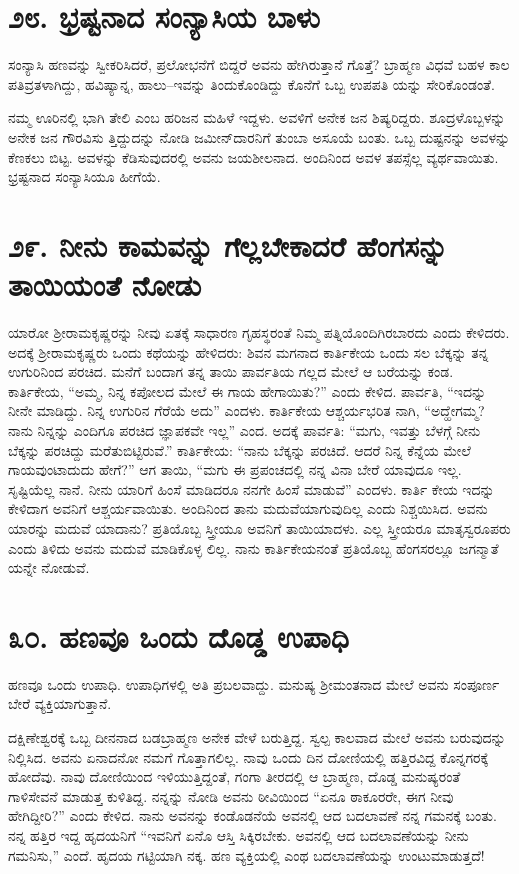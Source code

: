 \section{\num{೨೮. } ಭ್ರಷ್ಟನಾದ ಸಂನ್ಯಾಸಿಯ ಬಾಳು}

ಸಂನ್ಯಾಸಿ ಹಣವನ್ನು ಸ್ವೀಕರಿಸಿದರೆ, ಪ್ರಲೋಭನೆಗೆ ಬಿದ್ದರೆ ಅವನು ಹೇಗಿರುತ್ತಾನೆ ಗೊತ್ತೆ? ಬ್ರಾಹ್ಮಣ ವಿಧವೆ ಬಹಳ ಕಾಲ ಪತಿವ್ರತಳಾಗಿದ್ದು, ಹವಿಷ್ಯಾನ್ನ, ಹಾಲು–ಇವನ್ನು ತಿಂದುಕೊಂಡಿದ್ದು ಕೊನೆಗೆ ಒಬ್ಬ ಉಪಪತಿ ಯನ್ನು ಸೇರಿಕೊಂಡಂತೆ.

ನಮ್ಮ ಊರಿನಲ್ಲಿ ಭಾಗಿ ತೇಲಿ ಎಂಬ ಹರಿಜನ ಮಹಿಳೆ ಇದ್ದಳು. ಅವಳಿಗೆ ಅನೇಕ ಜನ ಶಿಷ್ಯರಿದ್ದರು. ಶೂದ್ರಳೊಬ್ಬಳನ್ನು ಅನೇಕ ಜನ ಗೌರವಿಸು ತ್ತಿದ್ದುದನ್ನು ನೋಡಿ ಜಮೀನ್​ದಾರನಿಗೆ ತುಂಬಾ ಅಸೂಯೆ ಬಂತು. ಒಬ್ಬ ದುಷ್ಟನನ್ನು ಅವಳನ್ನು ಕೆಣಕಲು ಬಿಟ್ಟ. ಅವಳನ್ನು ಕೆಡಿಸುವುದರಲ್ಲಿ ಅವನು ಜಯಶೀಲನಾದ. ಅಂದಿನಿಂದ ಅವಳ ತಪಸ್ಸೆಲ್ಲ ವ್ಯರ್ಥವಾಯಿತು. ಭ್ರಷ್ಟನಾದ ಸಂನ್ಯಾಸಿಯೂ ಹೀಗೆಯೆ.


\section{\num{೨೯. } ನೀನು ಕಾಮವನ್ನು ಗೆಲ್ಲಬೇಕಾದರೆ ಹೆಂಗಸನ್ನು ತಾಯಿಯಂತೆ ನೋಡು}

ಯಾರೋ ಶ್ರೀರಾಮಕೃಷ್ಣರನ್ನು ನೀವು ಏತಕ್ಕೆ ಸಾಧಾರಣ ಗೃಹಸ್ಥರಂತೆ ನಿಮ್ಮ ಪತ್ನಿಯೊಂದಿಗಿರಬಾರದು ಎಂದು ಕೇಳಿದರು. ಅದಕ್ಕೆ ಶ್ರೀರಾಮಕೃಷ್ಣರು ಒಂದು ಕಥೆಯನ್ನು ಹೇಳಿದರು: ಶಿವನ ಮಗನಾದ ಕಾರ್ತಿಕೇಯ ಒಂದು ಸಲ ಬೆಕ್ಕನ್ನು ತನ್ನ ಉಗುರಿನಿಂದ ಪರಚಿದ. ಮನೆಗೆ ಬಂದಾಗ ತನ್ನ ತಾಯಿ ಪಾರ್ವತಿಯ ಗಲ್ಲದ ಮೇಲೆ ಆ ಬರೆಯನ್ನು ಕಂಡ. ಕಾರ್ತಿಕೇಯ, “ಅಮ್ಮ, ನಿನ್ನ ಕಪೋಲದ ಮೇಲೆ ಈ ಗಾಯ ಹೇಗಾಯಿತು?” ಎಂದು ಕೇಳಿದ. ಪಾರ್ವತಿ, “ಇದನ್ನು ನೀನೇ ಮಾಡಿದ್ದು. ನಿನ್ನ ಉಗುರಿನ ಗೆರೆಯೆ ಅದು” ಎಂದಳು. ಕಾರ್ತಿಕೇಯ ಆಶ್ಚರ್ಯಭರಿತ ನಾಗಿ, “ಅದ್ಹೇಗಮ್ಮ? ನಾನು ನಿನ್ನನ್ನು ಎಂದಿಗೂ ಪರಚಿದ ಜ್ಞಾಪಕವೇ ಇಲ್ಲ” ಎಂದ. ಅದಕ್ಕೆ ಪಾರ್ವತಿ: “ಮಗು, ಇವತ್ತು ಬೆಳಗ್ಗೆ ನೀನು ಬೆಕ್ಕನ್ನು ಪರಚಿದ್ದು ಮರೆತುಬಿಟ್ಟಿರುವೆ.” ಕಾರ್ತಿಕೇಯ: “ನಾನು ಬೆಕ್ಕನ್ನು ಪರಚಿದೆ. ಆದರೆ ನಿನ್ನ ಕೆನ್ನೆಯ ಮೇಲೆ ಗಾಯವುಂಟಾದುದು ಹೇಗೆ?” ಆಗ ತಾಯಿ, “ಮಗು ಈ ಪ್ರಪಂಚದಲ್ಲಿ ನನ್ನ ವಿನಾ ಬೇರೆ ಯಾವುದೂ ಇಲ್ಲ. ಸೃಷ್ಟಿಯೆಲ್ಲ ನಾನೆ. ನೀನು ಯಾರಿಗೆ ಹಿಂಸೆ ಮಾಡಿದರೂ ನನಗೇ ಹಿಂಸೆ ಮಾಡುವೆ” ಎಂದಳು. ಕಾರ್ತಿ ಕೇಯ ಇದನ್ನು ಕೇಳಿದಾಗ ಅವನಿಗೆ ಆಶ್ಚರ್ಯವಾಯಿತು. ಅಂದಿನಿಂದ ತಾನು ಮದುವೆಯಾಗುವುದಿಲ್ಲ ಎಂದು ನಿಶ್ಚಯಿಸಿದ. ಅವನು ಯಾರನ್ನು ಮದುವೆ ಯಾದಾನು? ಪ್ರತಿಯೊಬ್ಬ ಸ್ತ್ರೀಯೂ ಅವನಿಗೆ ತಾಯಿಯಾದಳು. ಎಲ್ಲ ಸ್ತ್ರೀಯರೂ ಮಾತೃಸ್ವರೂಪರು ಎಂದು ತಿಳಿದು ಅವನು ಮದುವೆ ಮಾಡಿಕೊಳ್ಳ ಲಿಲ್ಲ. ನಾನು ಕಾರ್ತಿಕೇಯನಂತೆ ಪ್ರತಿಯೊಬ್ಬ ಹೆಂಗಸರಲ್ಲೂ ಜಗನ್ಮಾತೆ ಯನ್ನೇ ನೋಡುವೆ.


\section{\num{೩೦. } ಹಣವೂ ಒಂದು ದೊಡ್ಡ ಉಪಾಧಿ}

ಹಣವೂ ಒಂದು ಉಪಾಧಿ. ಉಪಾಧಿಗಳಲ್ಲಿ ಅತಿ ಪ್ರಬಲವಾದ್ದು. ಮನುಷ್ಯ ಶ್ರೀಮಂತನಾದ ಮೇಲೆ ಅವನು ಸಂಪೂರ್ಣ ಬೇರೆ ವ್ಯಕ್ತಿಯಾಗುತ್ತಾನೆ.

ದಕ್ಷಿಣೇಶ್ವರಕ್ಕೆ ಒಬ್ಬ ದೀನನಾದ ಬಡಬ್ರಾಹ್ಮಣ ಅನೇಕ ವೇಳೆ ಬರುತ್ತಿದ್ದ. ಸ್ವಲ್ಪ ಕಾಲವಾದ ಮೇಲೆ ಅವನು ಬರುವುದನ್ನು ನಿಲ್ಲಿಸಿದ. ಅವನು ಏನಾದನೋ ನಮಗೆ ಗೊತ್ತಾಗಲಿಲ್ಲ. ನಾವು ಒಂದು ದಿನ ದೋಣಿಯಲ್ಲಿ ಹತ್ತಿರವಿದ್ದ ಕೊನ್ನಗರಕ್ಕೆ ಹೋದೆವು. ನಾವು ದೋಣಿಯಿಂದ ಇಳಿಯುತ್ತಿದ್ದಂತೆ, ಗಂಗಾ ತೀರದಲ್ಲಿ ಆ ಬ್ರಾಹ್ಮಣ, ದೊಡ್ಡ ಮನುಷ್ಯರಂತೆ ಗಾಳಿಸೇವನೆ ಮಾಡುತ್ತ ಕುಳಿತಿದ್ದ. ನನ್ನನ್ನು ನೋಡಿ ಅವನು ಠೀವಿಯಿಂದ “ಏನೂ ಠಾಕೂರರೇ, ಈಗ ನೀವು ಹೇಗಿದ್ದೀರಿ?” ಎಂದು ಕೇಳಿದ. ನಾನು ಅವನನ್ನು ಕಂಡೊಡನೆಯೆ ಅವನಲ್ಲಿ ಆದ ಬದಲಾವಣೆ ನನ್ನ ಗಮನಕ್ಕೆ ಬಂತು. ನನ್ನ ಹತ್ತಿರ ಇದ್ದ ಹೃದಯನಿಗೆ “ಇವನಿಗೆ ಏನೊ ಆಸ್ತಿ ಸಿಕ್ಕಿರಬೇಕು. ಅವನಲ್ಲಿ ಆದ ಬದಲಾವಣೆಯನ್ನು ನೀನು ಗಮನಿಸು,” ಎಂದೆ. ಹೃದಯ ಗಟ್ಟಿಯಾಗಿ ನಕ್ಕ. ಹಣ ವ್ಯಕ್ತಿಯಲ್ಲಿ ಎಂಥ ಬದಲಾವಣೆಯನ್ನು ಉಂಟುಮಾಡುತ್ತದೆ!


